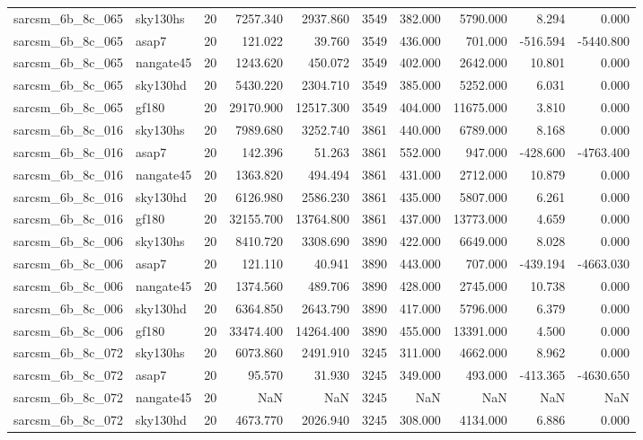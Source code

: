 \begin{longtable}{llrrrrrrrr}
sarcsm\_6b\_8c\_065 & sky130hs & 20 & 7257.340 & 2937.860 & 3549 & 382.000 & 5790.000 & 8.294 & 0.000 \\
sarcsm\_6b\_8c\_065 & asap7 & 20 & 121.022 & 39.760 & 3549 & 436.000 & 701.000 & -516.594 & -5440.800 \\
sarcsm\_6b\_8c\_065 & nangate45 & 20 & 1243.620 & 450.072 & 3549 & 402.000 & 2642.000 & 10.801 & 0.000 \\
sarcsm\_6b\_8c\_065 & sky130hd & 20 & 5430.220 & 2304.710 & 3549 & 385.000 & 5252.000 & 6.031 & 0.000 \\
sarcsm\_6b\_8c\_065 & gf180 & 20 & 29170.900 & 12517.300 & 3549 & 404.000 & 11675.000 & 3.810 & 0.000 \\
sarcsm\_6b\_8c\_016 & sky130hs & 20 & 7989.680 & 3252.740 & 3861 & 440.000 & 6789.000 & 8.168 & 0.000 \\
sarcsm\_6b\_8c\_016 & asap7 & 20 & 142.396 & 51.263 & 3861 & 552.000 & 947.000 & -428.600 & -4763.400 \\
sarcsm\_6b\_8c\_016 & nangate45 & 20 & 1363.820 & 494.494 & 3861 & 431.000 & 2712.000 & 10.879 & 0.000 \\
sarcsm\_6b\_8c\_016 & sky130hd & 20 & 6126.980 & 2586.230 & 3861 & 435.000 & 5807.000 & 6.261 & 0.000 \\
sarcsm\_6b\_8c\_016 & gf180 & 20 & 32155.700 & 13764.800 & 3861 & 437.000 & 13773.000 & 4.659 & 0.000 \\
sarcsm\_6b\_8c\_006 & sky130hs & 20 & 8410.720 & 3308.690 & 3890 & 422.000 & 6649.000 & 8.028 & 0.000 \\
sarcsm\_6b\_8c\_006 & asap7 & 20 & 121.110 & 40.941 & 3890 & 443.000 & 707.000 & -439.194 & -4663.030 \\
sarcsm\_6b\_8c\_006 & nangate45 & 20 & 1374.560 & 489.706 & 3890 & 428.000 & 2745.000 & 10.738 & 0.000 \\
sarcsm\_6b\_8c\_006 & sky130hd & 20 & 6364.850 & 2643.790 & 3890 & 417.000 & 5796.000 & 6.379 & 0.000 \\
sarcsm\_6b\_8c\_006 & gf180 & 20 & 33474.400 & 14264.400 & 3890 & 455.000 & 13391.000 & 4.500 & 0.000 \\
sarcsm\_6b\_8c\_072 & sky130hs & 20 & 6073.860 & 2491.910 & 3245 & 311.000 & 4662.000 & 8.962 & 0.000 \\
sarcsm\_6b\_8c\_072 & asap7 & 20 & 95.570 & 31.930 & 3245 & 349.000 & 493.000 & -413.365 & -4630.650 \\
sarcsm\_6b\_8c\_072 & nangate45 & 20 & NaN & NaN & 3245 & NaN & NaN & NaN & NaN \\
sarcsm\_6b\_8c\_072 & sky130hd & 20 & 4673.770 & 2026.940 & 3245 & 308.000 & 4134.000 & 6.886 & 0.000 \\

\end{longtable}
